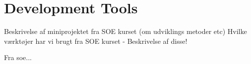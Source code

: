 \chapter{Development Tools}
	\label{cha:development_tools}
Beskrivelse af miniprojektet fra SOE kurset (om udviklings metoder etc)
Hvilke værktøjer har vi brugt fra SOE kurset
- Beskrivelse af disse!

Fra soe...

%
%
